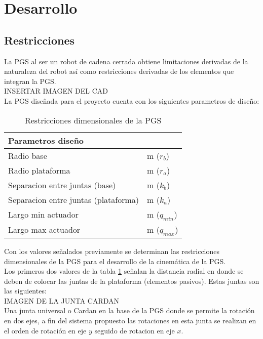 \section{Desarrollo}

\subsection{Restricciones}
La PGS al ser un robot de cadena cerrada obtiene limitaciones 
derivadas de la naturaleza del robot así como restricciones 
derivadas de los elementos que integran la PGS.\\

INSERTAR IMAGEN DEL CAD\\

La PGS diseñada para el proyecto cuenta con los siguientes 
parametros de diseño:

\begin{table}[h]\label{tab:restricciones}
\centering
\begin{tabular}{|ll|}
\hline
\multicolumn{2}{|l|}{Parametros diseño} \\ \hline
Radio base & m ($r_b$)\\ \hline
Radio plataforma & m ($r_a$)\\ \hline
Separacion entre juntas (base) & m ($k_b$)\\ \hline
Separacion entre juntas (plataforma) & m ($k_a$)\\ \hline
Largo min actuador & m ($q_{min}$)\\ \hline
Largo max actuador & m ($q_{max}$)\\ \hline
\end{tabular}
\caption{Restricciones dimensionales de la PGS}
\label{tab: restricciones}
\end{table}

Con los valores señalados previamente se determinan las restricciones 
dimensionales de la PGS para el desarrollo de la cinemática de la PGS.\\

Los primeros dos valores de la tabla \ref{tab: restricciones} señalan 
la distancia radial en donde se deben de colocar las juntas de la 
plataforma (elementos pasivos). Estas juntas son las siguientes:\\

IMAGEN DE LA JUNTA CARDAN\\

Una junta universal o Cardan en la base de la PGS donde se permite la 
rotación en dos ejes, a fin del sistema propuesto las rotaciones en esta junta 
se realizan en el orden de rotación en eje $y$ seguido de rotacion en eje $x$.\\

